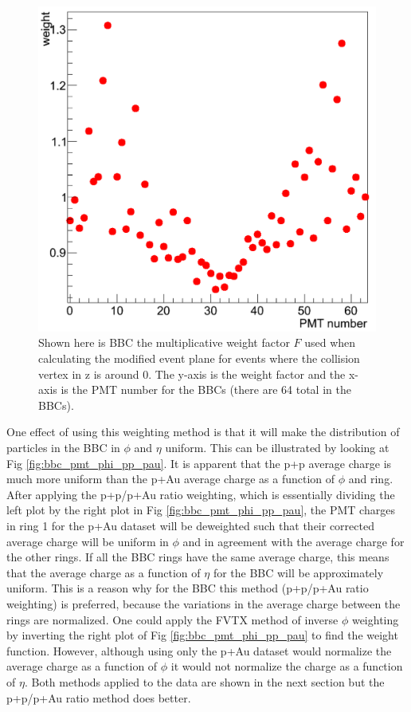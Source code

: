 \begin{figure}[h!]
\begin{center}
\includegraphics[width=0.5\linewidth]{figs/pmt_ratio_weight.png}
\caption{Shown here is BBC the multiplicative weight factor $F$ used when calculating the modified event plane for events where the collision vertex in z is around 0. The y-axis is the weight factor and the x-axis is the PMT number for the BBCs (there are 64 total in the BBCs). }
\label{fig:bbc_weight_function}
\end{center}
\end{figure}

One effect of using this weighting method is that it will make the distribution of particles in the BBC in $\phi$ and $\eta $ uniform. This can be illustrated by looking at Fig \ref{fig:bbc_pmt_phi_pp_pau}. It is apparent that the p+p average charge is much more uniform than the p+Au average charge as a function of $\phi$ and ring. After applying the p+p/p+Au ratio weighting, which is essentially dividing the left plot by the right plot in Fig \ref{fig:bbc_pmt_phi_pp_pau}, the PMT charges in ring 1 for the p+Au dataset will be deweighted such that their corrected average charge will be uniform in $\phi$ and in agreement with the average charge for the other rings. If all the BBC rings have the same average charge, this means that the average charge as a function of $\eta$ for the BBC will be approximately uniform. This is a reason why for the BBC this method (p+p/p+Au ratio weighting) is preferred, because the variations in the average charge between the rings are normalized. One could apply the FVTX method of inverse $\phi$ weighting by inverting the right plot of Fig \ref{fig:bbc_pmt_phi_pp_pau} to find the weight function. However, although using only the p+Au dataset would normalize the average charge as a function of $\phi$ it would not normalize the charge as a function of $\eta$. Both methods applied to the data are shown in the next section but the p+p/p+Au ratio method does better.

